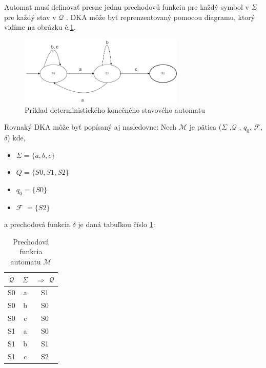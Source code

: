 Automat musí definovať presne jednu prechodovú funkciu pre každý symbol v $\Sigma$ pre každý stav v $\mathcal{Q}$ \cite{FiniteStateMachines}.
 DKA môže byť reprenzentovaný pomocou diagramu, ktorý vidíme na obrázku č.\ref{figure:dfa1}.

\newpage

\begin{figure}[!h]
    \centering
    \includegraphics[width=0.70\textwidth]{img/dfa.png}
    \caption{Príklad deterministického konečného stavového automatu}
    \label{figure:dfa1}
\end{figure}

Rovnaký DKA môže byť popísaný aj nasledovne:
Nech $\mathcal{M}$ je pätica ($\Sigma$ ,$\mathcal{Q}$ , $q_0$, $\mathcal{F}$, $\delta$) kde, 

\begin{itemize}
    \item \begin{math} \Sigma = \{a, b ,c \}  \end{math}
    \item \begin{math} Q = \{S0, S1, S2 \}  \end{math}
    \item \begin{math} q_0 = \{S0 \}  \end{math}
    \item $\mathcal{F}$ \begin{math} = \{S2\}  \end{math}
\end{itemize}
a prechodová funkcia $\delta$ je daná tabuľkou číslo \ref{table:dfaPrechodovaFunckcia}:

\begin{table}[!htbp]    
    \begin{center}
    \begin{tabular}{c c|c}
    $\mathcal{Q}$ & $\Sigma$ & $\Rightarrow$ $\mathcal{Q}$  \\ \hline
    S0 & a & S1 \\ 
    S0 & b & S0 \\ 
    S0 & c & S0 \\ 
    S1 & a & S0 \\
    S1 & b & S1 \\  
    S1 & c & S2 \\  
    \end{tabular}
    \caption{Prechodová funkcia automatu $\mathcal{M}$}
    \label{table:dfaPrechodovaFunckcia}
    \end{center}
    \end{table}


